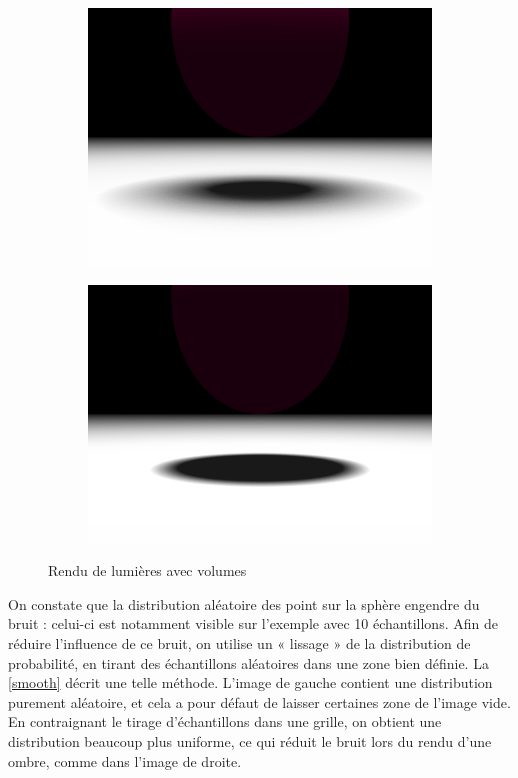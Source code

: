 \documentclass{article}
\begin{document}
\begin{figure}[hb]
  \begin{subfigure}{0.45\textwidth}
    \includegraphics[width=1\textwidth]{images/samples100r2.png}
  \end{subfigure}
  \begin{subfigure}{0.45\textwidth}
    \includegraphics[width=1\textwidth]{images/samples100r05.png}
  \end{subfigure}
  \caption{Rendu de lumières avec volumes\label{light}}
\end{figure}

On constate que la distribution aléatoire des point sur la sphère engendre
du bruit : celui-ci est notamment visible sur l'exemple avec 10 échantillons.
Afin de réduire l'influence de ce bruit, on utilise un « lissage » de la
distribution de probabilité, en tirant des échantillons aléatoires dans une
zone bien définie. La \cref{smooth} décrit une telle méthode. L'image de
gauche contient une distribution purement aléatoire, et cela a pour défaut de
laisser certaines zone de l'image vide. En contraignant le tirage
d'échantillons dans une grille, on obtient une distribution beaucoup plus
uniforme, ce qui réduit le bruit lors du rendu d'une ombre, comme dans l'image
de droite.
\end{document}
